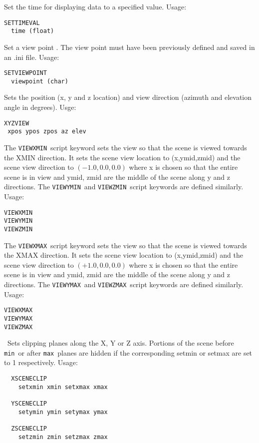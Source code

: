 \documentclass[11pt,twoside]{book}
\begin{document}
Set the time for displaying data to a specified value.
Usage:
\begin{lstlisting}
SETTIMEVAL
  time (float)
\end{lstlisting}

Set a view point .  The view point must have been previously defined and
saved in an .ini file.
Usage:
\begin{lstlisting}
SETVIEWPOINT
  viewpoint (char)
\end{lstlisting}

Sets the position (x, y and z location) and view direction (azimuth and elevation angle in degrees).
Usge:
\begin{lstlisting}
XYZVIEW
 xpos ypos zpos az elev
\end{lstlisting}

The {\tt VIEWXMIN}\ script keyword sets the view so that the scene
is viewed towards the XMIN direction.  It sets
the scene view location to (x,ymid,zmid)
and the scene view direction to $(-1.0,0.0,0.0)$ where
x is chosen so that the entire scene is in view and ymid, zmid
are the middle of the scene along y and z directions.  The {\tt VIEWYMIN}\ and {\tt VIEWZMIN}\ script
keywords are defined similarly.  Usage:
\begin{lstlisting}
VIEWXMIN
VIEWYMIN
VIEWZMIN
\end{lstlisting}

The {\tt VIEWXMAX}\ script keyword sets the view so that the scene
is viewed towards the XMAX direction.  It sets
the scene view location to (x,ymid,zmid)
and the scene view direction to $(+1.0,0.0,0.0)$ where
x is chosen so that the entire scene is in view and ymid, zmid
are the middle of the scene along y and z directions.  The {\tt VIEWYMAX}\ and {\tt VIEWZMAX}\ script
keywords are defined similarly.  Usage:
\begin{lstlisting}
VIEWXMAX
VIEWYMAX
VIEWZMAX
\end{lstlisting}

\ Sets clipping planes along the X, Y or Z axis.
Portions of the scene before {\tt min}\
or after {\tt max}\ planes are hidden if the corresponding setmin or setmax are set to 1 respectively.
Usage:
\begin{lstlisting}
  XSCENECLIP
    setxmin xmin setxmax xmax

  YSCENECLIP
    setymin ymin setymax ymax

  ZSCENECLIP
    setzmin zmin setzmax zmax
\end{lstlisting}
\end{document}
